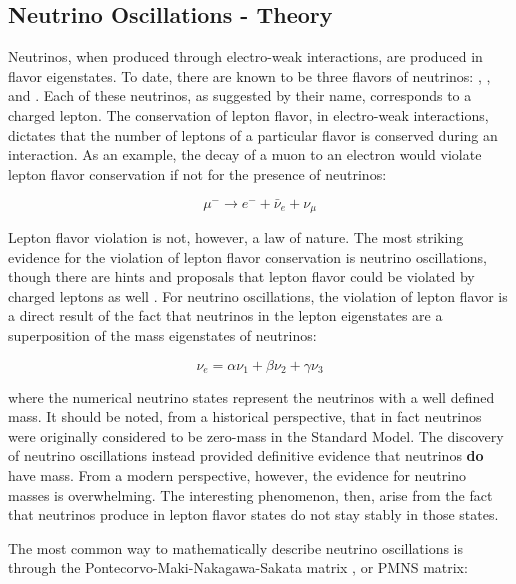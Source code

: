 \subsection{Neutrino Oscillations - Theory}


Neutrinos, when produced through electro-weak interactions, are produced in flavor eigenstates.  To date, there are known to be three flavors of neutrinos: \nue, \numu, and \nutau.  Each of these neutrinos, as suggested by their name, corresponds to a charged lepton.  The conservation of lepton flavor, in electro-weak interactions, dictates that the number of leptons of a particular flavor is conserved during an interaction.  As an example, the decay of a muon to an electron would violate lepton flavor conservation if not for the presence of neutrinos:

\begin{equation}
\mu^- \rightarrow e^- + \bar{\nu}_e + \nu_\mu
\end{equation}

Lepton flavor violation is not, however, a law of nature.  The most striking evidence for the violation of lepton flavor conservation is neutrino oscillations, though there are hints and proposals that lepton flavor could be violated by charged leptons as well \cite{Bartoszek:2014mya}.  For neutrino oscillations, the violation of lepton flavor is a direct result of the fact that neutrinos in the lepton eigenstates are a superposition of the mass eigenstates of neutrinos:

\begin{equation}
\nu_e = \alpha \nu_1 + \beta \nu_2 + \gamma \nu_3
\end{equation}

where the numerical neutrino states represent the neutrinos with a well defined mass.  It should be noted, from a historical perspective, that in fact neutrinos were originally considered to be zero-mass in the Standard Model.  The discovery of neutrino oscillations instead provided definitive evidence that neutrinos {\bf do} have mass.  From a modern perspective, however, the evidence for neutrino masses is overwhelming.  The interesting phenomenon, then, arise from the fact that neutrinos produce in lepton flavor states do not stay stably in those states.  

The most common way to mathematically describe neutrino oscillations is through the Pontecorvo-Maki-Nakagawa-Sakata matrix \cite{Maki:1962mu, Bilenky:1978nj}, or PMNS matrix:

